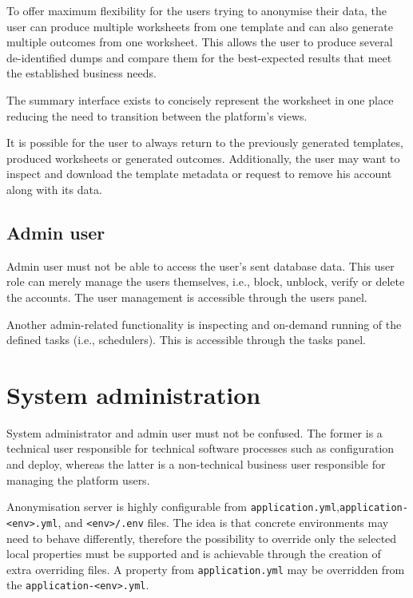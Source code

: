 \documentclass[a4paper,twoside,12pt]{book}
\begin{document}
To offer maximum flexibility for the users trying to anonymise their data, the user can produce multiple worksheets from one template and can also generate multiple outcomes from one worksheet. This allows the user to produce several de-identified dumps and compare them for the best-expected results that meet the established business needs.

The summary interface exists to concisely represent the worksheet in one place reducing the need to transition between the platform's views.

It is possible for the user to always return to the previously generated templates, produced worksheets or generated outcomes. Additionally, the user may want to inspect and download the template metadata or request to remove his account along with its data.

\subsection{Admin user}

Admin user must not be able to access the user's sent database data. This user role can merely manage the users themselves, i.e., block, unblock, verify or delete the accounts. The user management is accessible through the users panel.

Another admin-related functionality is inspecting and on-demand running of the defined tasks (i.e., schedulers). This is accessible through the tasks panel.

\section{System administration}

System administrator and admin user must not be confused. The former is a technical user responsible for technical software processes such as configuration and deploy, whereas the latter is a non-technical business user responsible for managing the platform users.

Anonymisation server is highly configurable from \verb|application.yml|,\newline \verb|application-<env>.yml|, and \verb|<env>/.env| files. The idea is that concrete environments may need to behave differently, therefore the possibility to override only the selected local properties must be supported and is achievable through the creation of extra overriding files. A property from \verb|application.yml| may be overridden from the \verb|application-<env>.yml|.
\end{document}
